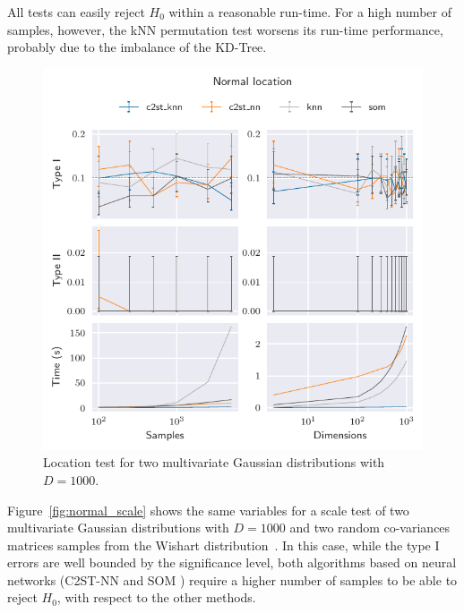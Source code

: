 All tests can easily reject $H_0$ within a reasonable run-time. For
a high number of samples, however, the \gls{kNN} permutation test worsens its run-time performance,
probably due to the imbalance of the KD-Tree.

\begin{figure}[htpb]
    \centering
    \includegraphics{images/6_som/normal_location}
    \caption[Location test for two multivariate Gaussian distributions.]{
    Location test for two multivariate Gaussian distributions with $D=1000$.
    }
    \label{fig:normal_location}
\end{figure}

Figure~\ref{fig:normal_scale} shows the same variables for a scale test of two multivariate
Gaussian distributions with $D=1000$ and two random co-variances matrices samples from the
Wishart distribution~\cite{smith1972algorithm}. In this case, while the type I errors are
well bounded by the significance level, both algorithms based on neural networks
(C2ST-NN and \gls{SOM} ) require a higher number of samples to be able to reject $H_0$, with respect
to the other methods.

